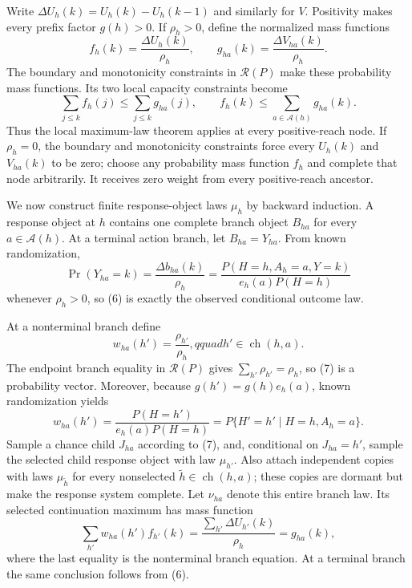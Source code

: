 Write \(\Delta U_h(k)=U_h(k)-U_h(k-1)\) and similarly for \(V\).  Positivity makes every prefix factor \(g(h)>0\).  If \(\rho_h>0\), define the normalized mass functions
\[
 f_h(k)=\frac{\Delta U_h(k)}{\rho_h},
 \qquad
 g_{ha}(k)=\frac{\Delta V_{ha}(k)}{\rho_h}.                \tag{4}
\]
The boundary and monotonicity constraints in \(\mathcal R(P)\) make these probability mass functions.  Its two local capacity constraints become
\[
 \sum_{j\leq k}f_h(j)\leq\sum_{j\leq k}g_{ha}(j),
 \qquad
 f_h(k)\leq\sum_{a\in\mathcal A(h)}g_{ha}(k).             \tag{5}
\]
Thus the local maximum-law theorem applies at every positive-reach node.  If \(\rho_h=0\), the boundary and monotonicity constraints force every \(U_h(k)\) and \(V_{ha}(k)\) to be zero; choose any probability mass function \(f_h\) and complete that node arbitrarily.  It receives zero weight from every positive-reach ancestor.

We now construct finite response-object laws \(\mu_h\) by backward induction.  A response object at \(h\) contains one complete branch object \(B_{ha}\) for every \(a\in\mathcal A(h)\).  At a terminal action branch, let \(B_{ha}=Y_{ha}\).  From known randomization,
\[
 \Pr(Y_{ha}=k)
 =\frac{\Delta b_{ha}(k)}{\rho_h}
 =\frac{P(H=h,A_h=a,Y=k)}{e_h(a)P(H=h)}                  \tag{6}
\]
whenever \(\rho_h>0\), so (6) is exactly the observed conditional outcome law.

At a nonterminal branch define
\[
 w_{ha}(h')=\frac{\rho_{h'}}{\rho_h},qquad
 h'\in\operatorname{ch}(h,a).                            \tag{7}
\]
The endpoint branch equality in \(\mathcal R(P)\) gives \(\sum_{h'}\rho_{h'}=\rho_h\), so (7) is a probability vector.  Moreover, because \(g(h')=g(h)e_h(a)\), known randomization yields
\[
 w_{ha}(h')
 =\frac{P(H=h')}{e_h(a)P(H=h)}
 =P\{H'=h'\mid H=h,A_h=a\}.                              \tag{8}
\]
Sample a chance child \(J_{ha}\) according to (7), and, conditional on \(J_{ha}=h'\), sample the selected child response object with law \(\mu_{h'}\).  Also attach independent copies with laws \(\mu_{\tilde h}\) for every nonselected \(\tilde h\in\operatorname{ch}(h,a)\); these copies are dormant but make the response system complete.  Let \(\nu_{ha}\) denote this entire branch law.  Its selected continuation maximum has mass function
\[
 \sum_{h'}w_{ha}(h')f_{h'}(k)
 =\frac{\sum_{h'}\Delta U_{h'}(k)}{\rho_h}
 =g_{ha}(k),                                               \tag{9}
\]
where the last equality is the nonterminal branch equation.  At a terminal branch the same conclusion follows from (6).


